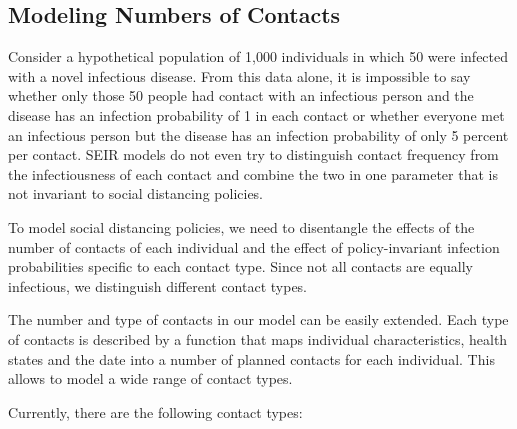\subsection{Modeling Numbers of Contacts}
\label{sec:number_of_contacts}

Consider a hypothetical population of 1,000 individuals in which 50 were infected with a
novel infectious disease. From this data alone, it is impossible to say whether only
those 50 people had contact with an infectious person and the disease has an infection
probability of 1 in each contact or whether everyone met an infectious person but the
disease has an infection probability of only 5 percent per contact. SEIR models do not
even try to distinguish contact frequency from the infectiousness of each contact and
combine the two in one parameter that is not invariant to social distancing policies.

To model social distancing policies, we need to disentangle the effects of the number of
contacts of each individual and the effect of policy-invariant infection probabilities
specific to each contact type. Since not all contacts are equally infectious, we
distinguish different contact types.

The number and type of contacts in our model can be easily extended. Each type of
contacts is described by a function that maps individual characteristics, health states
and the date into a number of planned contacts for each individual. This allows to model
a wide range of contact types.

Currently, there are the following contact types:

